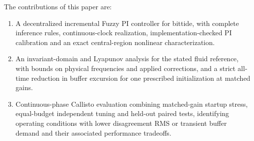The contributions of this paper are:
\begin{enumerate}
  \item A decentralized incremental Fuzzy PI controller for bittide,
  with complete inference rules, continuous-clock realization,
  implementation-checked PI calibration and an exact central-region
  nonlinear characterization.
  \item An invariant-domain and Lyapunov analysis for the stated fluid
  reference, with bounds on physical frequencies and applied corrections,
  and a strict all-time reduction in buffer excursion for one
  prescribed initialization at matched gains.
  \item Continuous-phase Callisto evaluation combining matched-gain
  startup stress, equal-budget independent tuning and held-out
  paired tests, identifying operating conditions with lower
  disagreement RMS or transient buffer demand and their associated
  performance tradeoffs.
\end{enumerate}



